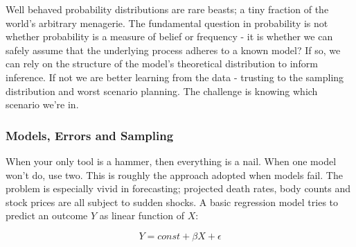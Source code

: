 \documentclass[10pt,a4paper,notitlepage, twocolumn]{article}
\begin{document}
Well behaved probability distributions are rare beasts; a tiny fraction of the world's arbitrary menagerie. The fundamental question in probability is not whether probability is a measure of belief or frequency - it is whether we can safely assume that the underlying process adheres to a known model? If so, we can rely on the structure of the model's theoretical distribution to inform inference. If not we are better learning from the data - trusting to the sampling distribution and worst scenario planning. The challenge is knowing which scenario we're in.

\subsubsection*{Models, Errors and Sampling}
When your only tool is a hammer, then everything is a nail. When one model won't do, use two. This is roughly the approach adopted when models fail. The problem is especially vivid in forecasting; projected death rates, body counts and stock prices are all subject to sudden shocks. A basic regression model tries to predict an outcome $Y$ as linear function of $X$:

$$ Y = const + \beta X + \epsilon $$
\end{document}
